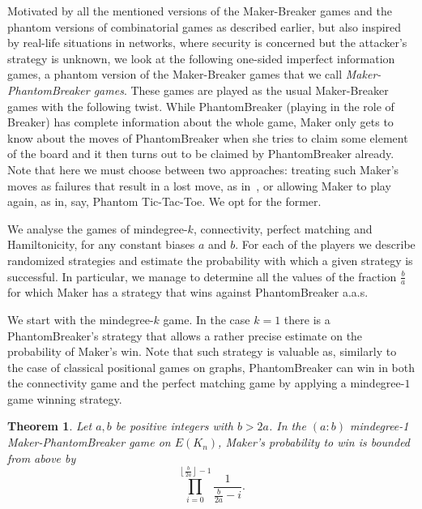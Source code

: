 \documentclass[11pt, a4paper]{article}
\numberwithin{equation}{section}
\numberwithin{figure}{section}
\newtheorem{theorem}{Theorem}
\newcommand{\mima}[1]{\textcolor{violet}{Mima: #1}}
\begin{document}
Motivated by all the mentioned versions of the Maker-Breaker games and the phantom versions of combinatorial games as described earlier, but also inspired by real-life situations in networks, where security is concerned but the attacker's strategy is unknown, 
we look at the following one-sided imperfect information games, a phantom version of the Maker-Breaker games that we call \emph{Maker-PhantomBreaker games}.
These games are played as the usual Maker-Breaker games with the following twist. While PhantomBreaker (playing in the role of Breaker) has complete information about the whole game, Maker only gets to know about the moves of PhantomBreaker when she tries to claim some element of the board and it then turns out to be claimed by PhantomBreaker already. Note that here we must choose between two approaches: treating such Maker’s moves as failures that result in a lost move, as in~\cite{bednarska2000biased}, or allowing Maker to play again, as in, say, Phantom Tic-Tac-Toe. We opt for the former.

We analyse the games of mindegree-$k$, connectivity, perfect matching and Hamiltonicity, for any constant biases $a$ and $b$. For each of the players we describe randomized strategies and estimate the probability with which a given strategy is successful. In particular, we manage to determine all the values of the fraction $\frac{b}{a}$ for which Maker has a strategy that wins against PhantomBreaker a.a.s.

\medskip

We start with the mindegree-$k$ game. In the case $k=1$ there is a PhantomBreaker's strategy that allows a rather precise estimate on the probability of Maker's win. Note that such strategy is valuable as, similarly to the case of classical positional games on graphs, PhantomBreaker can win in both the connectivity game and the perfect matching game by applying a mindegree-$1$ game winning strategy.

\begin{theorem}\label{thm:breaker_degree1}
Let $a,b$ be positive integers with $b>2a$.
In the $(a:b)$ mindegree-1 Maker-PhantomBreaker game on $E(K_n)$, Maker's probability to win is bounded from above by
$$ \prod_{i=0}^{\left\lfloor\frac{b}{2a}\right\rfloor -1} \frac{1}{\frac{b}{2a}-i}.$$
\end{theorem}
\end{document}
